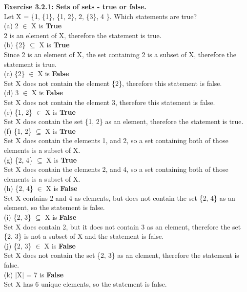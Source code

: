 \documentclass[12pt, letterpaper, twoside]{article}
\begin{document}
\newpage
\noindent \textbf{Exercise 3.2.1: Sets of sets - true or false.}\\
Let X = \{1, \{1\}, \{1, 2\}, 2, \{3\}, 4 \}. Which statements are true?\\
\break
(a) 2 $\in$ X is \textbf{True}\\
2 is an element of X, therefore the statement is true.\\
\break
(b) \{2\} $\subseteq$ X is \textbf{True}\\
Since 2 is an element of X, the set containing 2 is a subset of X, therefore the statement is true.\\
\break
(c) \{2\} $\in$ X is \textbf{False}\\
Set X does not contain the element \{2\}, therefore this statement is false. \\
\break
(d) 3 $\in$ X is \textbf{False}\\
Set X does not contain the element 3, therefore this statement is false.\\
\break
(e) \{1, 2\} $\in$ X is \textbf{True}\\
Set X does contain the set \{1, 2\} as an element, therefore the statement is true.\\
\break
(f) \{1, 2\} $\subseteq$ X is \textbf{True}\\
Set X does contain the elements 1, and 2, so a set containing both of those elements is a subset of X.\\
\break
(g) \{2, 4\} $\subseteq$ X is \textbf{True}\\
Set X does contain the elements 2, and 4, so a set containing both of those elements is a subset of X.\\
\break
(h) \{2, 4\} $\in$ X is \textbf{False}\\
Set X contains 2 and 4 as elements, but does not contain the set \{2, 4\} as an element, so the statement is false.\\
\break
(i) \{2, 3\} $\subseteq$ X is \textbf{False}\\
Set X does contain 2, but it does not contain 3 as an element, therefore the set \{2, 3\} is not a subset of X and the statement is false.\\
\break
(j) \{2, 3\} $\in$ X is \textbf{False}\\
Set X does not contain the set \{2, 3\} as an element, therefore the statement is false.\\
\break
(k) $|$X$|$ = 7 is \textbf{False}\\
Set X has 6 unique elements, so the statement is false.\\
\break
\end{document}
